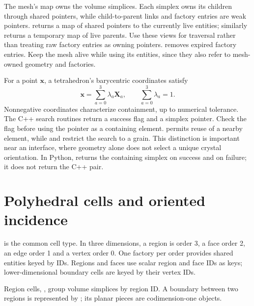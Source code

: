 The mesh's  map owns the volume simplices. Each simplex owns its children through shared pointers, while child-to-parent links and factory entries are weak pointers.  returns a map of shared pointers to the currently live entities;  similarly returns a temporary map of live parents. Use these views for traversal rather than treating raw factory entries as owning pointers.  removes expired factory entries. Keep the mesh alive while using its entities, since they also refer to mesh-owned geometry and factories.

For a point $\bm x$, a tetrahedron's barycentric coordinates satisfy
\begin{equation}
\bm x=\sum_{a=0}^{3}\lambda_a\bm X_a,\qquad
\sum_{a=0}^{3}\lambda_a=1.
\end{equation}
Nonnegative coordinates characterize containment, up to numerical tolerance. The C++ search routines return a success flag and a simplex pointer. Check the flag before using the pointer as a containing element.  permits reuse of a nearby element, while  and  restrict the search to a grain. This distinction is important near an interface, where geometry alone does not select a unique crystal orientation. In Python,  returns the containing simplex on success and  on failure; it does not return the C++ pair.

\section{Polyhedral cells and oriented incidence}
 is the common cell type. In three dimensions, a region is order 3, a face order 2, an edge order 1 and a vertex order 0. One factory per order provides shared entities keyed by IDs. Regions and faces use scalar region and face IDs as keys; lower-dimensional boundary cells are keyed by their vertex IDs.

Region cells, , group volume simplices by region ID. A boundary between two regions is represented by ; its planar pieces are codimension-one  objects.


